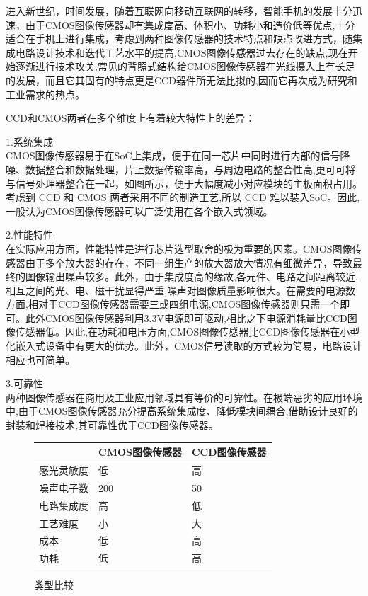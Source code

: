 进入新世纪，时间发展，随着互联网向移动互联网的转移，智能手机的发展十分迅速，由于CMOS图像传感器却有集成度高、体积小、功耗小和造价低等优点,十分适合在手机上进行集成，考虑到两种图像传感器的技术特点和缺点改进方式，随集成电路设计技术和迭代工艺水平的提高,CMOS图像传感器过去存在的缺点,现在开始逐渐进行技术攻关,常见的背照式结构给CMOS图像传感器在光线摄入上有长足的发展，而且它其固有的特点更是CCD器件所无法比拟的,因而它再次成为研究和工业需求的热点。

CCD和CMOS两者在多个维度上有着较大特性上的差异：

1.系统集成 \\
CMOS图像传感器易于在SoC上集成，便于在同一芯片中同时进行内部的信号降噪、数据整合和数据处理，片上数据传输率高，与周边电路的整合性高,更可可将与信号处理器整合在一起，如图所示，便于大幅度减小对应模块的主板面积占用。考虑到 CCD 和 CMOS 两者采用不同的制造工艺,所以 CCD 难以装入SoC。因此,一般认为CMOS图像传感器可以广泛使用在各个嵌入式领域。

2.性能特性\\
在实际应用方面，性能特性是进行芯片选型取舍的极为重要的因素。CMOS图像传感器由于多个放大器的存在，不同一组生产的放大器放大情况有细微差异，导致最终的图像输出噪声较多。此外，由于集成度高的缘故,各元件、电路之间距离较近,相互之间的光、电、磁干扰显得严重,噪声对图像质量影响很大。在需要的电源数方面,相对于CCD图像传感器需要三或四组电源,CMOS图像传感器则只需一个即可。此外CMOS图像传感器利用3.3V电源即可驱动,相比之下电源消耗量比CCD图像传感器低。因此,在功耗和电压方面,CMOS图像传感器比CCD图像传感器在小型化嵌入式设备中有更大的优势。此外，CMOS信号读取的方式较为简易，电路设计相应也可简单。

3.可靠性\\
两种图像传感器在商用及工业应用领域具有等价的可靠性。在极端恶劣的应用环境中,由于CMOS图像传感器充分提高系统集成度、降低模块间耦合,借助设计良好的封装和焊接技术,其可靠性优于CCD图像传感器。

\begin{figure}[h]
	\centering
	\caption{类型比较}
	\label{table:cmosccd}	
\begin{tabular}{|L{2.2cm}|C{4cm}|R{4cm}|}
\hline
	& CMOS图像传感器 & CCD图像传感器 \\ \hline
	 \hline
	感光灵敏度 & 低 & 高 \\ \hline
	噪声电子数 & 200 & 50 \\ \hline
	电路集成度 & 高 & 低 \\ \hline
	工艺难度 & 小 & 大 \\ \hline
	成本 & 低 & 高 \\ \hline
	功耗 & 低 & 高 \\  \hline
\end{tabular} 
\end{figure}

